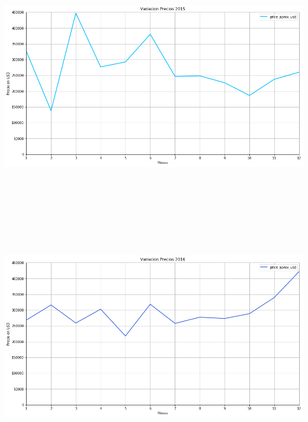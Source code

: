 \documentclass[a4paper, 10pt]{article}
\begin{document}
        		\begin{center}
       			\includegraphics[width=6in, height=4.2in]{images/variacion2015}
		   	\end{center}
        		\begin{center}
       			\includegraphics[width=6in, height=4.2in]{images/variacion2016}
		    \end{center}
\end{document}
